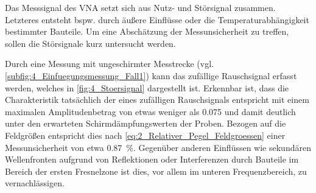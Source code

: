 

Das Messsignal des VNA setzt sich aus Nutz- und Störsignal zusammen. Letzteres entsteht bspw. durch äußere Einflüsse oder die Temperaturabhängigkeit bestimmter Bauteile. Um eine Abschätzung der Messunsicherheit zu treffen, sollen die Störsignale kurz untersucht werden.
\par
\vspace{\linespace}
Durch eine Messung mit ungeschirmter Messtrecke (vgl. \Abb\ref{subfig:4_Einfuegungsmessung_Fall1}) kann das zufällige Rauschsignal erfasst werden, welches in \Abb\ref{fig:4_Stoersignal} dargestellt ist. Erkennbar ist, dass die Charakteristik tatsächlich der eines zufälligen Rauschsignals entspricht mit einem maximalen Amplitudenbetrag von etwas weniger als \SI{0.075}{\Dezibel} und damit deutlich unter den erwarteten Schirmdämpfungswerten der Proben. Bezogen auf die Feldgrößen entspricht dies nach \Gleichung\eqref{eq:2_Relativer_Pegel_Feldgroessen} einer Messunsicherheit von etwa \SI{0.87}{\percent}. Gegenüber anderen Einflüssen wie sekundären Wellenfronten aufgrund von Reflektionen oder Interferenzen durch Bauteile im Bereich der ersten Fresnelzone ist dies, vor allem im unteren Frequenzbereich, zu vernachlässigen. 
\par


